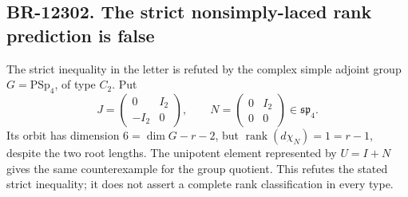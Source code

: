 \subsection{BR-12302. The strict nonsimply-laced rank prediction is false}
The strict inequality in the letter is refuted by the
complex simple adjoint group \(G=\mathrm{PSp}_4\), of type
\(C_2\). Put
\[
 J=\begin{pmatrix}0&I_2\\-I_2&0\end{pmatrix},\qquad
 N=\begin{pmatrix}0&I_2\\0&0\end{pmatrix}
       \in\mathfrak{sp}_4.
\]
Its orbit has dimension \(6=\dim G-r-2\), but
\(\operatorname{rank}(d\chi_N)=1=r-1\), despite the two
root lengths. The unipotent element represented by \(U=I+N\)
gives the same counterexample for the group quotient.
This refutes the stated strict inequality;
it does not assert a complete rank classification in every type.

